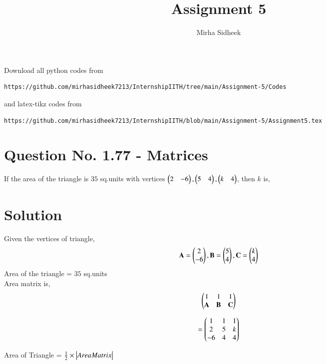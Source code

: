 \documentclass[journal,12pt,twocolumn]{IEEEtran}
\begin{document}
     \def\centbox#1{\makebox[0in]{#1}}
     \def\topbox#1{\raisebox{-\baselineskip}[0in][0in]{#1}}
     \def\midbox#1{\raisebox{-0.5\baselineskip}[0in][0in]{#1}}
\vspace{3cm}
\title{Assignment 5}
\author{Mirha Sidheek}
\maketitle
\newpage
\bigskip
\renewcommand{\thefigure}{\theenumi}
\renewcommand{\thetable}{\theenumi}
Download all python codes from 
\begin{lstlisting}
https://github.com/mirhasidheek7213/InternshipIITH/tree/main/Assignment-5/Codes
\end{lstlisting}
%
and latex-tikz codes from 
%
\begin{lstlisting}
https://github.com/mirhasidheek7213/InternshipIITH/blob/main/Assignment-5/Assignment5.tex
\end{lstlisting}
\section{\textbf{Question No. 1.77 - Matrices}}
 If the area of the triangle is $35$ sq.units with vertices $\begin{pmatrix}2 &-6\end{pmatrix}, \begin{pmatrix}5 & 4\end{pmatrix}, \begin{pmatrix}k & 4 \end{pmatrix}$, then $k$ is,
 
%
\section{\textbf {Solution}}
Given the vertices of triangle, 
\begin{align}
   \mathbf{A} = \begin{pmatrix}2\\-6\end{pmatrix} , \mathbf{B} = \begin{pmatrix}5 \\ 4\end{pmatrix}, \mathbf{C} = \begin{pmatrix}k\\4\end{pmatrix} 
\end{align}
Area of the triangle = $35$ sq.units\\

Area matrix is,
\begin{align}
   \begin{pmatrix}1 & 1& 1 \\
   \mathbf{A}&\mathbf{B}&\mathbf{C}\end{pmatrix}
\end{align}

\begin{align}
   = \begin{pmatrix}
    1 & 1 & 1 \\ 
    2 & 5 & k \\ 
    -6 & 4 & 4\end{pmatrix}
\end{align}



   Area of Triangle = $\frac12  \times \begin{vmatrix}Area Matrix\end{vmatrix}$
\end{document}
